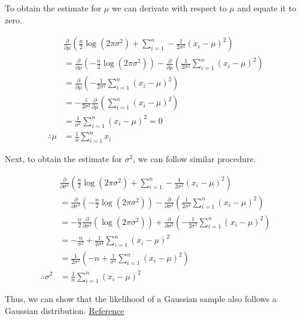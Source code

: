 \begin{enumerate}
		To obtain the estimate for $\mu$ we can derivate with respect to $\mu$ and equate it to zero.

		\begin{align*}
		    & \frac{\partial}{\partial\mu} \left( \frac{n}{2} \log(2\pi\sigma^{2}) + \sum_{i=1}^{n} -\frac{1}{2\sigma^{2}} (x_{i} - \mu)^{2} \right) \\
		    & = \frac{\partial}{\partial\mu} \left( -\frac{n}{2} \log (2\pi\sigma^{2}) \right) - \frac{\partial}{\partial\mu} \left( \frac{1}{2\sigma^{2}} \sum_{i=1}^{n} (x_{i} - \mu)^{2} \right) \\
		    & = \frac{\partial}{\partial\mu} \left( - \frac{1}{2\sigma^{2}} \sum_{i=1}^{n} (x_{i} - \mu)^{2} \right) \\
		    & = - \frac{1}{2\sigma^{2}} \frac{\partial}{\partial\mu} \left( \sum_{i=1}^{n} (x_{i} - \mu)^{2} \right) \\
		    & = \frac{1}{\sigma^{2}} \sum_{i=1}^{n} (x_{i} - \mu)^{2} = 0 \\
    \therefore \mu & = \frac{1}{n} \sum_{i=1}^{n} x_{i}
		\end{align*}

		Next, to obtain the estimate for $\sigma^{2}$, we can follow similar procedure.

		\begin{align*}
		    & \frac{\partial}{\partial\sigma^{2}} \left( \frac{n}{2} \log(2\pi\sigma^{2}) + \sum_{i=1}^{n} -\frac{1}{2\sigma^{2}} (x_{i} - \mu)^{2} \right) \\
		    & = \frac{\partial}{\partial\sigma^{2}} \left( -\frac{n}{2} \log (2\pi\sigma^{2}) \right) - \frac{\partial}{\partial\sigma^{2}} \left( \frac{1}{2\sigma^{2}} \sum_{i=1}^{n} (x_{i} - \mu)^{2} \right) \\
		    & = -\frac{n}{2} \frac{\partial}{\partial\sigma^{2}} (\log(2\pi\sigma^{2})) + \frac{\partial}{\partial\sigma^{2}} \left( -\frac{1}{2\sigma^{2}} \sum_{i=1}^{n} (x_{i} - \mu)^{2} \right) \\
		    & = -\frac{n}{\sigma^{2}} + \frac{1}{2\sigma^{4}} \sum_{i=1}^{n} (x_{i} - \mu)^{2} \\
		    & = \frac{1}{2\sigma^{2}} \left( -n + \frac{1}{\sigma^{2}} \sum_{i=1}^{n} (x_{i} - \mu)^{2} \right) \\
		    \therefore \sigma^{2} & =  \frac{1}{n} \sum_{i=1}^{n}(x_{i} - \mu)^{2}
		\end{align*}

		Thus, we can show that the likelihood of a Gaussian sample also follows a Gaussian distribution. \href{https://jrmeyer.github.io/machinelearning/2017/08/18/mle.html}{Reference}

\end{enumerate}